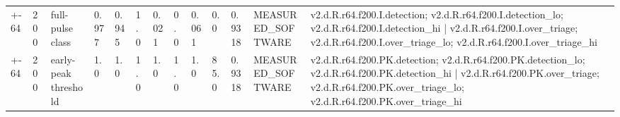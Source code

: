 \begin{table}[t]
\begin{tabular}{lllllllllllll}
+-64 & 200 & full-pulse class & 0.977 & 0.945 & 1.0 & 0.021 & 0.0 & 0.061 & 0.0 & 0.9318 & MEASURED\_SOFTWARE & v2.d.R.r64.f200.I.detection; v2.d.R.r64.f200.I.detection\_lo; v2.d.R.r64.f200.I.detection\_hi | v2.d.R.r64.f200.I.over\_triage; v2.d.R.r64.f200.I.over\_triage\_lo; v2.d.R.r64.f200.I.over\_triage\_hi \\
+-64 & 200 & early-peak threshold & 1.0 & 1.0 & 1.0 & 1.0 & 1.0 & 1.0 & 85.0 & 0.9318 & MEASURED\_SOFTWARE & v2.d.R.r64.f200.PK.detection; v2.d.R.r64.f200.PK.detection\_lo; v2.d.R.r64.f200.PK.detection\_hi | v2.d.R.r64.f200.PK.over\_triage; v2.d.R.r64.f200.PK.over\_triage\_lo; v2.d.R.r64.f200.PK.over\_triage\_hi \\
\bottomrule
\end{tabular}
\end{table}
